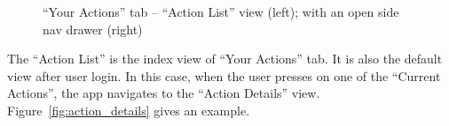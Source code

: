 \begin{figure}
\begin{center}
	  \caption{``Your Actions'' tab -- ``Action List'' view (left); with an open side nav drawer (right)}\label{fig:menu}
\end{center}
\end{figure} 
The ``Action List'' is the index view of ``Your Actions'' tab. It is also the default view after user login. In this case, when the user presses on one of the ``Current Actions'', the app navigates to the ``Action Details'' view. Figure~\ref{fig:action_details} gives an example. 
% 

